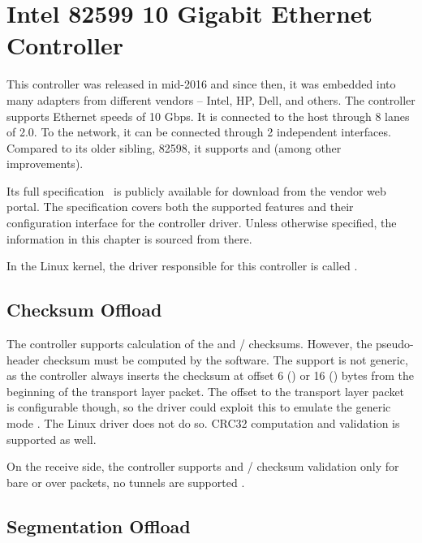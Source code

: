 \section{Intel 82599 10 Gigabit Ethernet Controller}
\label{nic:82599}
\renewcommand{\sect}[1]{\cite[#1]{82599}}

This controller was released in mid-2016 and since then, it was embedded into
many adapters from different vendors -- Intel, HP, Dell, and others. The
controller supports Ethernet speeds of 10 Gbps. It is connected to the host
through 8 lanes of  2.0. To the network, it can be connected through
2 independent interfaces. Compared to its older sibling, 82598, it supports
 and  (among other improvements).

Its full specification~\cite{82599} is publicly available for download from the
vendor web portal. The specification covers both the supported features and their
configuration interface for the controller driver. Unless otherwise specified,
the information in this chapter is sourced from there.

In the Linux kernel, the driver responsible for this controller is called
.

\subsection{Checksum Offload}

The controller supports calculation of the  and /
checksums. However, the pseudo-header checksum must be computed by the software. The
support is not generic, as the controller always inserts the checksum at offset
6 () or 16 () bytes from the beginning of the transport layer packet.
The offset to the transport layer packet is configurable though, so the driver
could exploit this to emulate the generic mode \sect{7.2.5}. The Linux driver
does not do so.  CRC32 computation and validation is supported as well.

On the receive side, the controller supports  and /
checksum validation only for bare  or  over  packets, no
tunnels are supported \sect{7.1.11}.

\subsection{Segmentation Offload}

